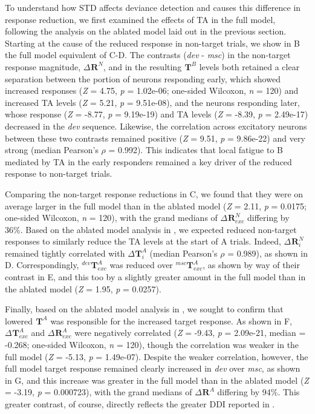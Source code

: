 \documentclass[9pt,lineno,onehalfspacing]{elife}
\newcommand{\dev}{\textit{dev}}
\newcommand{\msc}{\textit{msc}}
\newcommand{\R}[3][]{{}^{#1}_{}\boldsymbol R^{#2}_{#3}}
\newcommand{\T}[3][]{{}^{#1}_{}\boldsymbol T^{#2}_{#3}}
\begin{document}
To understand how STD affects deviance detection and causes this difference in response reduction, we first examined the effects of TA in the full model, following the analysis on the ablated model laid out in the previous section. Starting at the cause of the reduced response in non-target trials, we show in B the full model equivalent of C-D. The contrasts (\dev{} - \msc{}) in the non-target response magnitude, $\Delta \R{N}{}$, and in the resulting $\T{B}{}$ levels both retained a clear separation between the portion of neurons responding early, which showed increased responses (\textit{Z} = 4.75, \textit{p} = 1.02e-06; one-sided Wilcoxon, \textit{n} = 120) and increased TA levels (\textit{Z} = 5.21, \textit{p} = 9.51e-08), and the neurons responding later, whose response (\textit{Z} = -8.77, \textit{p} = 9.19e-19) and TA levels (\textit{Z} = -8.39, \textit{p} = 2.49e-17) decreased in the \dev{} sequence. Likewise, the correlation across excitatory neurons between these two contrasts remained positive (\textit{Z} = 9.51, \textit{p} = 9.86e-22) and very strong (median Pearson's $\rho$ = 0.992). This indicates that local fatigue to B mediated by TA in the early responders remained a key driver of the reduced response to non-target trials.

Comparing the non-target response reductions in C, we found that they were on average larger in the full model than in the ablated model (\textit{Z} = 2.11, \textit{p} = 0.0175; one-sided Wilcoxon, \textit{n} = 120), with the grand medians of $\Delta \R{N}{exc}$ differing by 36\%. Based on the ablated model analysis in , we expected reduced non-target responses to similarly reduce the TA levels at the start of A trials. Indeed, $\Delta \R{N}{i}$ remained tightly correlated with $\Delta \T{A}{i}$ (median Pearson's $\rho$ = 0.989), as shown in D. Correspondingly, $\T[dev]{A}{exc}$ was reduced over $\T[msc]{A}{exc}$, as shown by way of their contrast in E, and this too by a slightly greater amount in the full model than in the ablated model (\textit{Z} = 1.95, \textit{p} = 0.0257).

Finally, based on the ablated model analysis in , we sought to confirm that lowered $\T{A}{}$ was responsible for the increased target response. As shown in F, $\Delta \T{A}{exc}$ and $\Delta \R{A}{exc}$ were negatively correlated (\textit{Z} = -9.43, \textit{p} = 2.09e-21, median = -0.268; one-sided Wilcoxon, \textit{n} = 120), though the correlation was weaker in the full model (\textit{Z} = -5.13, \textit{p} = 1.49e-07). Despite the weaker correlation, however, the full model target response remained clearly increased in \dev{} over \msc{}, as shown in G, and this increase was greater in the full model than in the ablated model (\textit{Z} = -3.19, \textit{p} = 0.000723), with the grand medians of $\Delta \R{A}{}$ differing by 94\%. This greater contrast, of course, directly reflects the greater DDI reported in .
\end{document}
